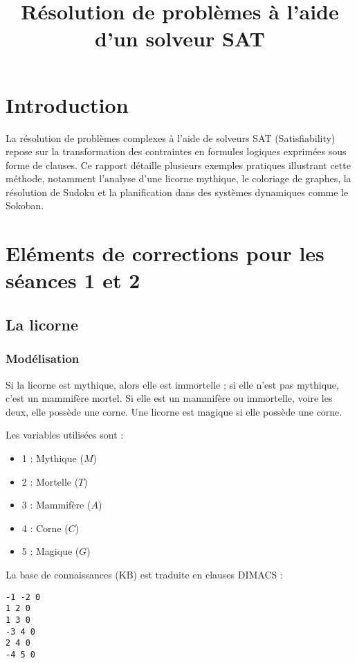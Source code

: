 \documentclass[a4paper,12pt]{article}
\title{\textbf{Résolution de problèmes à l'aide d'un solveur SAT}}
\author{}
\date{}
\begin{document}
\maketitle

\tableofcontents
\newpage

\section{Introduction}
La résolution de problèmes complexes à l'aide de solveurs SAT (Satisfiability) repose sur la transformation des contraintes en formules logiques exprimées sous forme de clauses. Ce rapport détaille plusieurs exemples pratiques illustrant cette méthode, notamment l'analyse d'une licorne mythique, le coloriage de graphes, la résolution de Sudoku et la planification dans des systèmes dynamiques comme le Sokoban.

\section{Eléments de corrections pour les séances 1 et 2}

\subsection{La licorne}

\subsubsection{Modélisation}
Si la licorne est mythique, alors elle est immortelle ; si elle n'est pas mythique, c'est un mammifère mortel. Si elle est un mammifère ou immortelle, voire les deux, elle possède une corne. Une licorne est magique si elle possède une corne.

Les variables utilisées sont :
\begin{itemize}
    \item 1 : Mythique ($M$)
    \item 2 : Mortelle ($T$)
    \item 3 : Mammifère ($A$)
    \item 4 : Corne ($C$)
    \item 5 : Magique ($G$)
\end{itemize}

La base de connaissances (KB) est traduite en clauses DIMACS :
\begin{verbatim}
-1 -2 0
1 2 0
1 3 0
-3 4 0
2 4 0
-4 5 0
\end{verbatim}
\end{document}

